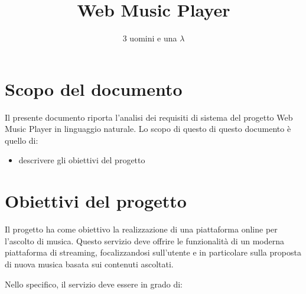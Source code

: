 \documentclass[a4paper,12pt]{article}
\title{Web Music Player}
\author{3 uomini e una $\lambda$}
\begin{document}
\maketitle
\newpage

\tableofcontents
\newpage

\section{Scopo del documento}

Il presente documento riporta l’analisi dei requisiti di sistema del progetto Web Music Player in linguaggio naturale. Lo scopo di questo di questo documento è quello di:
\begin{itemize}
    \item descrivere gli obiettivi del progetto
\end{itemize}

\section{Obiettivi del progetto}

Il progetto ha come obiettivo la realizzazione di una piattaforma online per l’ascolto di musica. Questo servizio deve offrire le funzionalità di un moderna piattaforma di streaming, focalizzandosi sull’utente e in particolare sulla proposta di nuova musica basata sui contenuti ascoltati.

Nello specifico, il servizio deve essere in grado di:
\end{document}
